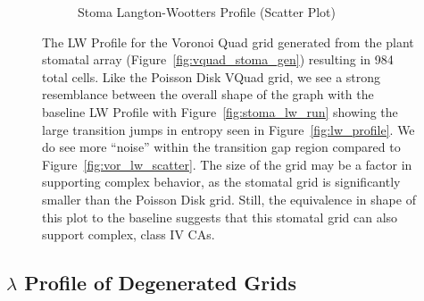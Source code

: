 \documentclass[a4paper,11pt]{article}
\begin{document}
\begin{figure}[htp]
\begin{subfigure}[t]{0.45\textwidth}
  \caption{Stoma Langton-Wootters Profile (Scatter Plot)}
  \label{fig:stoma_lw_scatter}
  \end{subfigure}
\caption[Stoma Langton-Wootters Profile]{
  The LW Profile for the Voronoi Quad grid generated from the plant stomatal array (Figure~\ref{fig:vquad_stoma_gen}) resulting in 984 total cells. Like the Poisson Disk VQuad grid, we see a strong resemblance between the overall shape of the graph with the baseline LW Profile with Figure~\ref{fig:stoma_lw_run} showing the large transition jumps in entropy seen in Figure~\ref{fig:lw_profile}. We do see more ``noise'' within the transition gap region compared to Figure~\ref{fig:vor_lw_scatter}. The size of the grid may be a factor in supporting complex behavior, as the stomatal grid is significantly smaller than the Poisson Disk grid. Still, the equivalence in shape of this plot to the baseline suggests that this stomatal grid can also support complex, class IV CAs.
}
\label{fig:stoma_lw_profile}
\end{figure}


\subsection{$\lambda$ Profile of Degenerated Grids}
\end{document}
